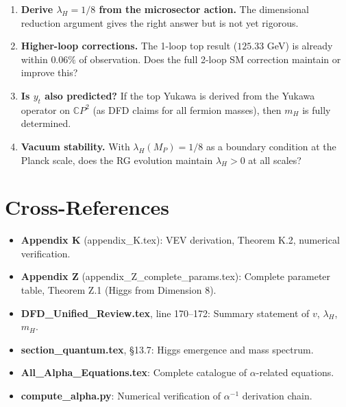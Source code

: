 \documentclass[11pt]{article}
\theoremstyle{definition}
\begin{document}
\begin{enumerate}
\item \textbf{Derive $\lambda_H = 1/8$ from the microsector action.}
      The dimensional reduction argument gives the right answer but is
      not yet rigorous.
\item \textbf{Higher-loop corrections.} The 1-loop top result
      ($125.33$ GeV) is already within $0.06\%$ of observation.
      Does the full 2-loop SM correction maintain or improve this?
\item \textbf{Is $y_t$ also predicted?} If the top Yukawa is derived
      from the Yukawa operator on $\mathbb{C}P^2$ (as DFD claims
      for all fermion masses), then $m_H$ is fully determined.
\item \textbf{Vacuum stability.} With $\lambda_H(M_P) = 1/8$ as a
      boundary condition at the Planck scale, does the RG evolution
      maintain $\lambda_H > 0$ at all scales?
\end{enumerate}

\section{Cross-References}

\begin{itemize}
\item \textbf{Appendix K} (appendix\_K.tex): VEV derivation,
      Theorem K.2, numerical verification.
\item \textbf{Appendix Z} (appendix\_Z\_complete\_params.tex):
      Complete parameter table, Theorem Z.1 (Higgs from Dimension 8).
\item \textbf{DFD\_Unified\_Review.tex}, line 170--172: Summary
      statement of $v$, $\lambda_H$, $m_H$.
\item \textbf{section\_quantum.tex}, \S13.7: Higgs emergence and
      mass spectrum.
\item \textbf{All\_Alpha\_Equations.tex}: Complete catalogue of
      $\alpha$-related equations.
\item \textbf{compute\_alpha.py}: Numerical verification of
      $\alpha^{-1}$ derivation chain.
\end{itemize}
\end{document}
